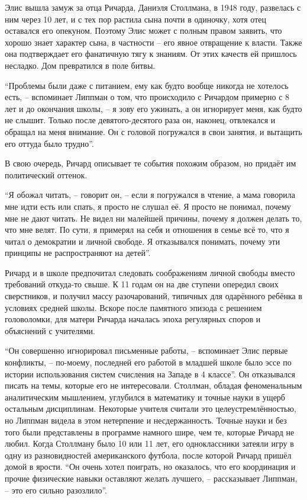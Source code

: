 Элис вышла замуж за отца Ричарда, Даниэля Столлмана, в 1948 году, развелась с ним через 10 лет, и с тех пор растила сына почти в одиночку, хотя отец оставался его опекуном. Поэтому Элис может с полным правом заявить, что хорошо знает характер сына, в частности -- его явное отвращение к власти. Также она подтверждает его фанатичную тягу к знаниям. От этих качеств ей пришлось несладко. Дом превратился в поле битвы.

\enquote{Проблемы были даже с питанием, ему как будто вообще никогда не хотелось есть, -- вспоминает Липпман о том, что происходило с Ричардом примерно с 8 лет и до окончания школы, -- я зову его ужинать, а он игнорирует меня, как будто не слышит. Только после девятого-десятого раза он, наконец, отвлекался и обращал на меня внимание. Он с головой погружался в свои занятия, и вытащить его оттуда было трудно}.

В свою очередь, Ричард описывает те события похожим образом, но придаёт им политический оттенок.

\enquote{Я обожал читать, -- говорит он, -- если я погружался в чтение, а мама говорила мне идти есть или спать, я просто не слушал её. Я просто не понимал, почему мне не дают читать. Не видел ни малейшей причины, почему я должен делать то, что мне велят. По сути, я примерял на себя и отношения в семье всё то, что я читал о демократии и личной свободе. Я отказывался понимать, почему эти принципы не распространяют на детей}.

Ричард и в школе предпочитал следовать соображениям личной свободы вместо требований откуда-то свыше. К 11 годам он на две ступени опередил своих сверстников, и получил массу разочарований, типичных для одарённого ребёнка в условиях средней школы. Вскоре после памятного эпизода с решением головоломки, для матери Ричарда началась эпоха регулярных споров и объяснений с учителями.

\enquote{Он совершенно игнорировал письменные работы, -- вспоминает Элис первые конфликты, -- по-моему, последней его работой в младшей школе было эссе по истории использования систем счисления на Западе в 4 классе}. Он отказывался писать на темы, которые его не интересовали. Столлман, обладая феноменальным аналитическим мышлением, углубился в математику и точные науки в ущерб остальным дисциплинам. Некоторые учителя считали это целеустремлённостью, но Липпман видела в этом нетерпение и несдержанность. Точные науки и без того были представлены в программе намного шире, чем те, которые Ричард не любил. Когда Столлману было 10 или 11 лет, его одноклассники затеяли игру в одну из разновидностей американского футбола, после которой Ричард пришёл домой в ярости. \enquote{Он очень хотел поиграть, но оказалось, что его координация и прочие физические навыки оставляют желать лучшего, -- рассказывает Липпман, -- это его сильно разозлило}.

